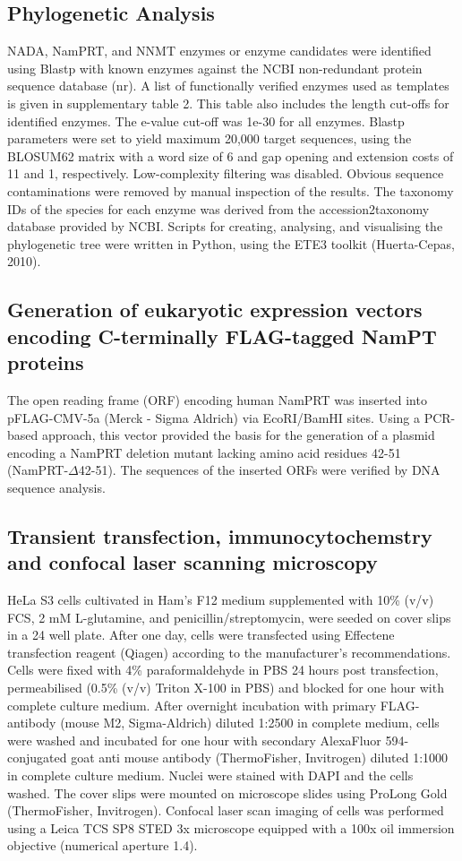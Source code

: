 \subsection{Phylogenetic Analysis}

NADA, NamPRT, and NNMT enzymes or enzyme candidates were identified using Blastp with known enzymes against the NCBI non-redundant protein sequence database (nr). A list of functionally verified enzymes used as templates is given in supplementary table 2. This table also includes the length cut-offs for identified enzymes. The e-value cut-off was 1e-30 for all enzymes. Blastp parameters were set to yield maximum 20,000 target sequences, using the BLOSUM62 matrix with a word size of 6 and gap opening and extension costs of 11 and 1, respectively. Low-complexity filtering was disabled. Obvious sequence contaminations were removed by manual inspection of the results. The taxonomy IDs of the species for each enzyme was derived from the accession2taxonomy database provided by NCBI. Scripts for creating, analysing, and visualising the phylogenetic tree were written in Python, using the ETE3 toolkit (Huerta-Cepas, 2010).


\subsection{Generation of eukaryotic expression vectors encoding C-terminally FLAG-tagged NamPT proteins}

The open reading frame (ORF) encoding human NamPRT was inserted into pFLAG-CMV-5a (Merck - Sigma Aldrich) via EcoRI/BamHI sites. Using a PCR-based approach, this vector provided the basis for the generation of a plasmid encoding a NamPRT deletion mutant lacking amino acid residues 42-51 (NamPRT-$\Delta$42-51). The sequences of the inserted ORFs were verified by DNA sequence analysis.


\subsection{Transient transfection, immunocytochemstry and confocal laser scanning microscopy}

HeLa S3 cells cultivated in Ham’s F12 medium supplemented with 10\% (v/v) FCS, 2 mM L-glutamine, and penicillin/streptomycin, were seeded on cover slips in a 24 well plate. After one day, cells were transfected using Effectene transfection reagent (Qiagen) according to the manufacturer’s recommendations. Cells were fixed with 4\% paraformaldehyde in PBS 24 hours post transfection, permeabilised (0.5\% (v/v) Triton X-100 in PBS) and blocked for one hour with complete culture medium. After overnight incubation with primary FLAG-antibody (mouse M2, Sigma-Aldrich) diluted 1:2500 in complete medium, cells were washed and incubated for one hour with secondary AlexaFluor 594-conjugated goat anti mouse antibody (ThermoFisher, Invitrogen) diluted 1:1000 in complete culture medium. Nuclei were stained with DAPI and the cells washed. The cover slips were mounted on microscope slides using ProLong Gold (ThermoFisher, Invitrogen). Confocal laser scan imaging of cells was performed using a Leica TCS SP8 STED 3x microscope equipped with a 100x oil immersion objective (numerical aperture 1.4).
